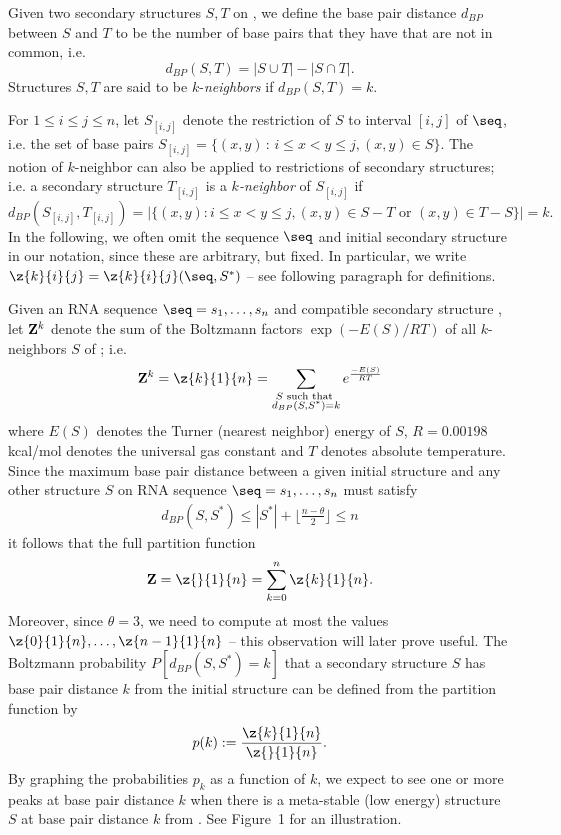 Given two secondary structures $S,T$ on \seq, we
define the base pair distance $d_{BP}$ between $S$ and $T$
to be the number of base pairs that they have that are not in
common, i.e.
\begin{equation}
d_{BP}(S,T) = |S \cup T| - |S \cap T|.
\end{equation}
Structures $S,T$ are said to be $k$-{\em neighbors} if $d_{BP}(S,T) = k$.


For $1\leq i \leq j \leq n$, let
$S_{[i,j]}$ denote the restriction of $S$ to interval
$[i,j]$ of $\seq$, i.e. the set of base pairs
%
$S_{[i,j]} = \{ (x,y) \,:\, i \leq  x < y \leq j,  (x,y) \in S \}$.
%
The notion of $k$-neighbor can also be applied to restrictions of secondary
structures; i.e. a secondary structure $T_{[i,j]}$ is a
{\em $k$-neighbor} of $S_{[i,j]}$ if
\[
d_{BP}(S_{[i,j]},T_{[i,j]})= |\{ (x,y): i \leq x<y\leq j,
(x,y) \in S-T \mbox{ or } (x,y) \in T-S \}| = k.
\]
In the following,
we often omit the sequence $\seq$ and initial secondary structure \strSt in our
notation, since these are arbitrary, but fixed.
In particular, we write $\z{k}{i}{j} = \z{k}{i}{j}(\seq,S^*)$ --
see following paragraph for definitions.


Given an RNA sequence $\seq=s_1,\ldots,s_n$ and compatible secondary structure
\strSt, let ${\bf Z}^k$ denote the sum
of the Boltzmann factors $\exp(-E(S)/RT)$ of all $k$-neighbors $S$ of  \strSt;
i.e.
\[
{\bf Z}^k = \z{k}{1}{n} =
\sum_{\substack{S \text{ such that }\\ d_{BP}(S,S^*)=k}}
e^{\frac{-E(S)}{RT}}
\]
where $E(S)$ denotes the Turner (nearest neighbor)
energy \cite{turner,xia:RNA}
of $S$, $R = 0.00198$ kcal/mol denotes the universal
gas constant and $T$ denotes absolute temperature.
Since the maximum base pair distance between a given initial
structure \strSt and any other structure $S$ on RNA sequence
$\seq = s_1,\ldots,s_n$ must satisfy
\begin{eqnarray}
\label{eq:upperBound}
d_{BP}(S,S^*) \leq |S^*| + \lfloor \frac{n-\theta}{2} \rfloor \leq n
\end{eqnarray}
it follows that the full partition function
\begin{eqnarray}
\label{eq:mcCaskillPartitionFun}
{\bf Z}=\z{}{1}{n} = \sum_{k=0}^n \z{k}{1}{n}.
\end{eqnarray}
Moreover, since $\theta=3$,
we need to compute at most the values
$\z{0}{1}{n},\ldots,\z{n-1}{1}{n}$ -- this observation will later prove useful.
The Boltzmann probability
$P[d_{BP}(S,S^*) = k]$
that a secondary structure $S$ has base pair distance $k$ from the initial
structure \strSt can be defined from the partition function by
\[
p(k) :=\frac{\z{k}{1}{n}}{\z{}{1}{n}}.
\]
By graphing the probabilities $p_k$ as a function of $k$,
we expect to see one or more peaks at base pair distance $k$ when
there is a meta-stable (low energy) structure $S$
at base pair distance $k$ from \strSt.
See Figure~1 for an illustration.

